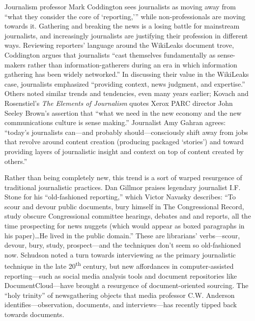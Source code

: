 Journalism professor Mark Coddington sees journalists as moving away from ``what they consider the core of `reporting,'\thinspace'' while non-professionals are moving towards it.\autocite[682]{coddington_defending_2014} Gathering and breaking the news is a losing battle for mainstream journalists, and increasingly journalists are justifying their profession in different ways. Reviewing reporters' language around the WikiLeaks document trove, Coddington argues that journalists ``cast themselves fundamentally as sense-makers rather than information-gatherers during an era in which information gathering has been widely networked.''\autocite[678]{coddington_defending_2014} In discussing their value in the WikiLeaks case, journalists emphasized ``providing context, news judgment, and expertise.''\autocite[689]{coddington_defending_2014} Others noted similar trends and tendencies, even many years earlier; Kovach and Rosenstiel's \emph{The Elements of Journalism} quotes Xerox PARC director John Seeley Brown's assertion that ``what we need in the new economy and the new communications culture is sense making.''\autocite[19]{kovach_elements_2001} Journalist Amy Gahran agrees: ``today's journalists can---and probably should---consciously shift away from jobs that revolve around content creation (producing packaged `stories') and toward providing layers of journalistic insight and context on top of content created by others.''\autocite{gahran_swimming_2008}

Rather than being completely new, this trend is a sort of warped resurgence of traditional journalistic practices. Dan Gillmor praises legendary journalist I.F. Stone for his ``old-fashioned reporting,'' which Victor Navasky describes: ``To scour and devour public documents, bury himself in The Congressional Record, study obscure Congressional committee hearings, debates and and reports, all the time prospecting for news nuggets (which would appear as boxed paragraphs in his paper)\ldots He lived in the public domain.''\autocite[3-4]{gillmor_we_2006} These are librarians' verbs---scour, devour, bury, study, prospect---and the techniques don't seem so old-fashioned now. Schudson noted a turn towards interviewing as the primary journalistic technique in the late 20\textsuperscript{th} century, but new affordances in computer-assisted reporting---such as social media analysis tools and document repositories like DocumentCloud---have brought a resurgence of document-oriented sourcing. The ``holy trinity'' of newsgathering objects that media professor C.W. Anderson identifies---observation, documents, and interviews---has recently tipped back towards documents.\autocite[680]{coddington_defending_2014}

